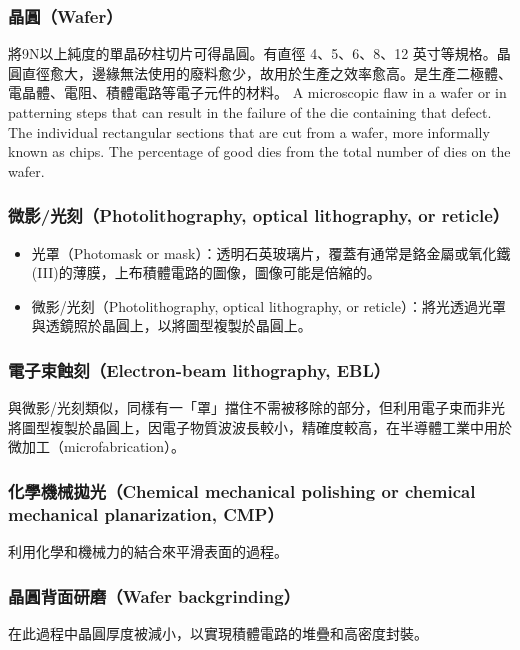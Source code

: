 \documentclass[a4paper,12pt]{report}
\begin{document}
\begin{itemize}
\begin{itemize}
\subsubsection{晶圓（Wafer）}
\bct\bfH\ctr{}\caption{German Wikipediabiatch, original upload 7. Okt 2004 by Stahlkocher de:Bild:Wafer 2 Zoll bis 8 Zoll.jpg. https://commons.m.wikimedia.org/wiki/File:Wafer\_2\_Zoll\_bis\_8\_Zoll\_2.jpg.}\ef\FB\ect
將9N以上純度的單晶矽柱切片可得晶圓。有直徑 4、5、6、8、12 英寸等規格。晶圓直徑愈大，邊緣無法使用的廢料愈少，故用於生產之效率愈高。是生產二極體、電晶體、電阻、積體電路等電子元件的材料。
A microscopic flaw in a wafer or in patterning steps that can result
in the failure of the die containing that defect.
The individual rectangular sections that are cut from a wafer, more
informally known as chips.
The percentage of good dies from the total number of dies on the
wafer.
\subsubsection{微影/光刻（Photolithography, optical lithography, or reticle）}
\begin{itemize}
\item 光罩（Photomask or mask）：透明石英玻璃片，覆蓋有通常是鉻金屬或氧化鐵(III)的薄膜，上布積體電路的圖像，圖像可能是倍縮的。
\item 微影/光刻（Photolithography, optical lithography, or reticle）：將光透過光罩與透鏡照於晶圓上，以將圖型複製於晶圓上。
\end{itemize}
\subsubsection{電子束蝕刻（Electron-beam lithography, EBL）}
與微影/光刻類似，同樣有一「罩」擋住不需被移除的部分，但利用電子束而非光將圖型複製於晶圓上，因電子物質波波長較小，精確度較高，在半導體工業中用於微加工（microfabrication）。
\subsubsection{化學機械拋光（Chemical mechanical polishing or chemical mechanical planarization, CMP）}
利用化學和機械力的結合來平滑表面的過程。
\subsubsection{晶圓背面研磨（Wafer backgrinding）}
在此過程中晶圓厚度被減小，以實現積體電路的堆疊和高密度封裝。

\end{itemize}
\end{itemize}
\end{document}
